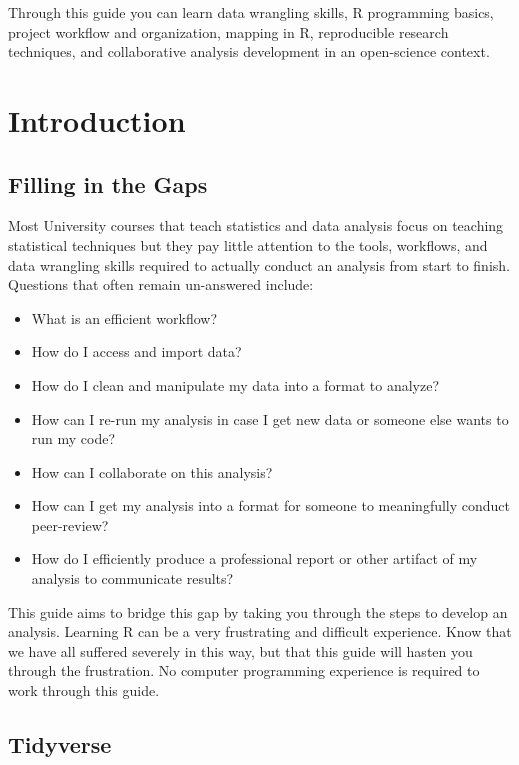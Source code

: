 \documentclass[]{book}
\providecommand{\tightlist}{%
  \setlength{\itemsep}{0pt}\setlength{\parskip}{0pt}}
\begin{document}
Through this guide you can learn data wrangling skills, R programming
basics, project workflow and organization, mapping in R, reproducible
research techniques, and collaborative analysis development in an
open-science context.

\chapter{Introduction}\label{introduction}

\section{Filling in the Gaps}\label{filling-in-the-gaps}

Most University courses that teach statistics and data analysis focus on
teaching statistical techniques but they pay little attention to the
tools, workflows, and data wrangling skills required to actually conduct
an analysis from start to finish. Questions that often remain
un-answered include:

\begin{itemize}
\tightlist
\item
  What is an efficient workflow?
\item
  How do I access and import data?
\item
  How do I clean and manipulate my data into a format to analyze?
\item
  How can I re-run my analysis in case I get new data or someone else
  wants to run my code?
\item
  How can I collaborate on this analysis?
\item
  How can I get my analysis into a format for someone to meaningfully
  conduct peer-review?
\item
  How do I efficiently produce a professional report or other artifact
  of my analysis to communicate results?
\end{itemize}

This guide aims to bridge this gap by taking you through the steps to
develop an analysis. Learning R can be a very frustrating and difficult
experience. Know that we have all suffered severely in this way, but
that this guide will hasten you through the frustration. No computer
programming experience is required to work through this guide.

\section{Tidyverse}\label{tidyverse}
\end{document}
